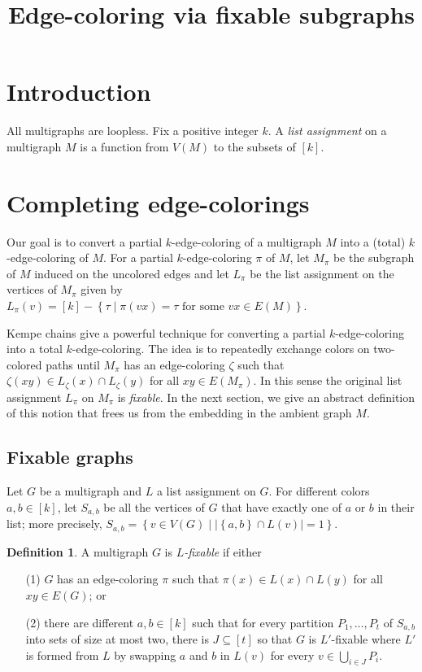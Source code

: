 \documentclass[12pt]{article}
\theoremstyle{plain}
\theoremstyle{definition}
\newtheorem{defn}{Definition}
\theoremstyle{remark}
\newcommand{\set}[1]{\left\{ #1 \right\}}
\newcommand{\setb}[3]{\left\{ #1 \in #2 \mid #3 \right\}}
\newcommand{\setbs}[2]{\left\{ #1 \mid #2 \right\}}
\newcommand{\card}[1]{\left|#1\right|}
\newcommand{\irange}[1]{\left[#1\right]}
\begin{document}
\title{Edge-coloring via fixable subgraphs}
\maketitle

\section{Introduction}
All multigraphs are loopless.  Fix a positive integer $k$.  A \emph{list assignment} on a multigraph $M$ is a function from $V(M)$ to the subsets of $\irange{k}$.

\section{Completing edge-colorings}
Our goal is to convert a partial $k$-edge-coloring of a multigraph $M$ into a (total) $k$-edge-coloring of $M$.  For a partial $k$-edge-coloring $\pi$ of $M$, let $M_\pi$ be the subgraph of $M$ induced on the uncolored edges and let $L_\pi$ be the list assignment on the vertices of $M_\pi$ given by 
$L_\pi(v) = \irange{k} - \setbs{\tau}{\pi(vx) = \tau \text{ for some  } vx \in E(M)}$. 

Kempe chains give a powerful technique for converting a partial $k$-edge-coloring into a total $k$-edge-coloring.  The idea is to repeatedly exchange colors on two-colored paths until $M_\pi$ has an edge-coloring $\zeta$ such that $\zeta(xy) \in L_\zeta(x) \cap L_\zeta(y)$ for all $xy \in E(M_\pi)$.  In this sense the original list assignment $L_\pi$ on $M_\pi$ is \emph{fixable}. In the next section, we give an abstract definition of this notion that frees us from the embedding in the ambient graph $M$.

\subsection{Fixable graphs}
Let $G$ be a multigraph and $L$ a list assignment on $G$.  For different colors $a,b \in \irange{k}$, let $S_{a,b}$ be all the vertices of $G$ that have exactly one of $a$ or $b$ in their list; more precisely, $S_{a,b} = \setb{v}{V(G)}{\card{\set{a,b} \cap L(v)} = 1}$.  

\begin{defn}
A multigraph $G$ is \emph{$L$-fixable} if either
\begin{enumerate}
\item[(1)] $G$ has an edge-coloring $\pi$ such that $\pi(x) \in L(x) \cap L(y)$ for all $xy \in E(G)$; or
\item[(2)] there are different $a,b \in \irange{k}$ such that for every partition $P_1, \ldots, P_t$ of $S_{a,b}$ into sets of size at most two, 
      there is $J \subseteq \irange{t}$ so that $G$ is $L'$-fixable where $L'$ is formed from $L$ by swapping $a$ and $b$ in $L(v)$ for every $v \in \bigcup_{i \in J} P_i$.
\end{enumerate}
\end{defn}
\end{document}

